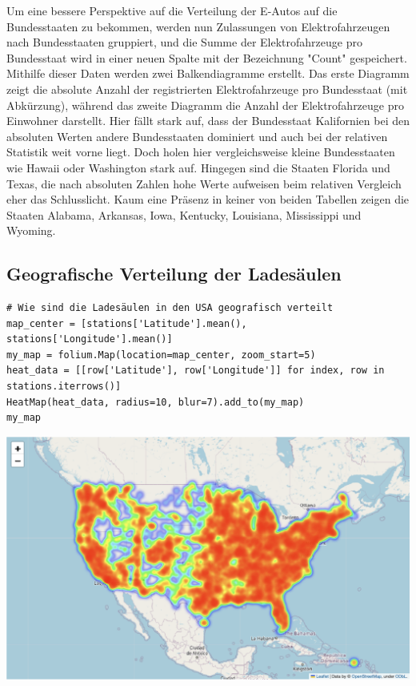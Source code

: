 Um eine bessere Perspektive auf die Verteilung der E-Autos auf die Bundesstaaten zu bekommen, werden nun Zulassungen von Elektrofahrzeugen nach Bundesstaaten gruppiert, und die Summe der Elektrofahrzeuge pro Bundesstaat wird in einer neuen Spalte mit der Bezeichnung "Count" gespeichert. Mithilfe dieser Daten werden zwei Balkendiagramme erstellt. Das erste Diagramm zeigt die absolute Anzahl der registrierten Elektrofahrzeuge pro Bundesstaat (mit Abkürzung), während das zweite Diagramm die Anzahl der Elektrofahrzeuge pro Einwohner darstellt. 
Hier fällt stark auf, dass der Bundesstaat Kalifornien bei den absoluten Werten andere Bundesstaaten dominiert und auch bei der relativen Statistik weit vorne liegt. Doch holen hier vergleichsweise kleine Bundesstaaten wie Hawaii oder Washington stark auf. Hingegen sind die Staaten Florida und Texas, die nach absoluten Zahlen hohe Werte aufweisen beim relativen Vergleich eher das Schlusslicht. Kaum eine Präsenz in keiner von beiden Tabellen zeigen die Staaten Alabama, Arkansas, Iowa, Kentucky, Louisiana, Mississippi und Wyoming.

\subsection{Geografische Verteilung der Ladesäulen}

\begin{verbatim}
# Wie sind die Ladesäulen in den USA geografisch verteilt
map_center = [stations['Latitude'].mean(), stations['Longitude'].mean()]
my_map = folium.Map(location=map_center, zoom_start=5)
heat_data = [[row['Latitude'], row['Longitude']] for index, row in stations.iterrows()]
HeatMap(heat_data, radius=10, blur=7).add_to(my_map)
my_map
\end{verbatim}

\begin{center}
\includegraphics[scale=0.26]{img/output_3_0.png}
\end{center}

